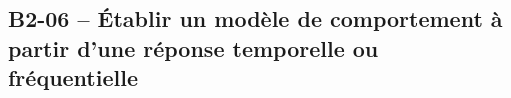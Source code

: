 \subsection{B2-06 -- Établir un modèle de comportement à partir d'une réponse temporelle ou fréquentielle}

\renewcommand{\repExo}{../../ExercicesCompetences/B2_ProposerModele/B2_06_ModeleComportement}


\renewcommand{\td}{502_Divers}
\graphicspath{{\repStyle/png/}{\repExo/\td/images/}}

